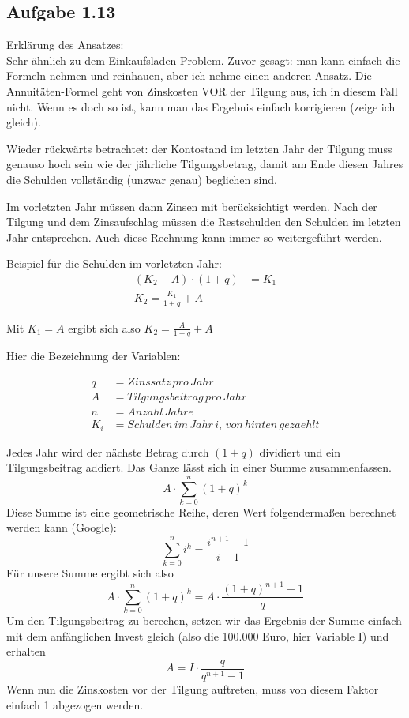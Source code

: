 \documentclass{standalone}
\begin{document}
\subsection{Aufgabe 1.13}
Erklärung des Ansatzes: \\
Sehr ähnlich zu dem Einkaufsladen-Problem. Zuvor gesagt: man kann einfach die Formeln nehmen und reinhauen, aber ich nehme einen anderen Ansatz. Die Annuitäten-Formel geht von Zinskosten VOR der Tilgung aus, ich in diesem Fall nicht. Wenn es doch so ist, kann man das Ergebnis einfach korrigieren (zeige ich gleich).

Wieder rückwärts betrachtet: der Kontostand im letzten Jahr der Tilgung muss genauso hoch sein wie der jährliche Tilgungsbetrag, damit am Ende diesen Jahres die Schulden vollständig (unzwar genau) beglichen sind.

Im vorletzten Jahr müssen dann Zinsen mit berücksichtigt werden. Nach der Tilgung und dem Zinsaufschlag müssen die Restschulden den Schulden im letzten Jahr entsprechen. Auch diese Rechnung kann immer so weitergeführt werden. 

Beispiel für die Schulden im vorletzten Jahr:
\begin{align}
    (K_{2} - A) \cdot (1+q) &= K_{1} \\
    K_{2} = \frac{K_{1}}{1+q} + A
\end{align}

Mit $K_{1} = A$ ergibt sich also $K_{2} = \frac{A}{1+q} + A$

Hier die Bezeichnung der Variablen:

\begin{align}
    q &= Zinssatz\, pro\, Jahr \\
    A &= Tilgungsbeitrag\, pro\, Jahr \\
    n &= Anzahl\, Jahre \\
    K_{i} &= Schulden\, im\, Jahr\, i,\, von\, hinten\, gezaehlt
\end{align}

Jedes Jahr wird der nächste Betrag durch $(1+q)$ dividiert und ein Tilgungsbeitrag addiert.
Das Ganze lässt sich in einer Summe zusammenfassen.
$$A \cdot \sum_{k=0}^{n} (1+q)^k $$
Diese Summe ist eine geometrische Reihe, deren Wert folgendermaßen berechnet werden kann (Google):
$$ \sum_{k=0}^{n} i^k = \frac{i^{n+1} - 1}{i - 1} $$
Für unsere Summe ergibt sich also 
$$ A \cdot \sum_{k=0}^{n}(1+q)^k = A \cdot \frac{(1+q)^{n+1}-1}{q}$$
Um den Tilgungsbeitrag zu berechen, setzen wir das Ergebnis der Summe einfach mit dem anfänglichen Invest gleich (also die 100.000 Euro, hier Variable I) und erhalten
$$A = I \cdot \frac{q}{q^{n+1}-1}$$
Wenn nun die Zinskosten vor der Tilgung auftreten, muss von diesem Faktor einfach 1 abgezogen werden.
\end{document}
